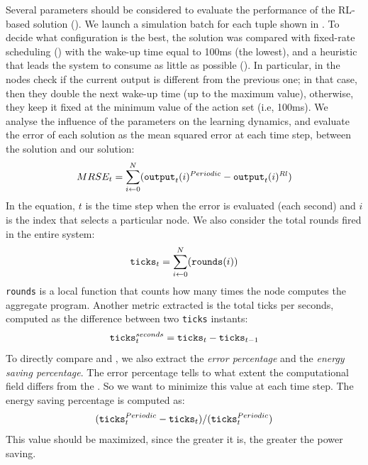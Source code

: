 Several parameters should be considered to evaluate the performance of the \ac{RL}-based solution (\rlsol{}). 
%
We launch a simulation batch for each tuple shown in .
%
To decide what configuration is the best, 
 the \rlsol{} solution was compared with fixed-rate scheduling (\periodicsol{}) 
 with the wake-up time equal to 100ms (the lowest),
 and a heuristic that leads the system to consume as little as possible (\adhocsol{}).
%
In particular, in \adhocsol{} the nodes check if the current output is different from the previous one; 
 in that case, then they double the next wake-up time (up to the maximum value),
 otherwise, they keep it fixed at the minimum value of the action set (i.e, 100ms).
%
We analyse the influence of the parameters on the learning dynamics, 
 and evaluate the error of each solution as the mean squared error 
 at each time step, between the \periodicsol{} solution and our \rlsol{} solution:
%
\begin{equation}
    MRSE_t = \sum_{i \leftarrow 0}^N (\text{\texttt{output}}_t(i)^{Periodic} - \text{\texttt{output}}_t(i)^{Rl})
\end{equation}
In the equation, 
 $t$ is the time step when the error is evaluated 
 (each second) and $i$ is the index that selects a particular node.
%
We also consider the total rounds fired in the entire system:
\begin{equation}
    \text{\texttt{ticks}}_t = \sum_{i \leftarrow 0}^N (\text{\texttt{rounds}}(i))
\end{equation}
\texttt{rounds} is a local function that counts how many times the node computes the aggregate program. 
%
Another metric extracted is the total ticks per seconds, computed as the difference between two \texttt{ticks} instants: 
\begin{equation}
    \text{\texttt{ticks}}^{seconds}_t = \text{\texttt{ticks}}_t - \text{\texttt{ticks}}_{t-1}    
\end{equation}
%
To directly compare \rlsol{} and \adhocsol{}, 
 we also extract the \emph{error percentage} and the \emph{energy saving percentage}.
%
The error percentage tells to what extent the computational field differs from the \periodicsol{}. 
 So we want to minimize this value at each time step. 
 The energy saving percentage is computed as: 
\begin{equation}
(\text{\texttt{ticks}}^{Periodic}_t - \text{\texttt{ticks}}_t) / (\text{\texttt{ticks}}^{Periodic}_t)
\end{equation}
%
This value should be maximized, since the greater it is, the greater the power saving.

